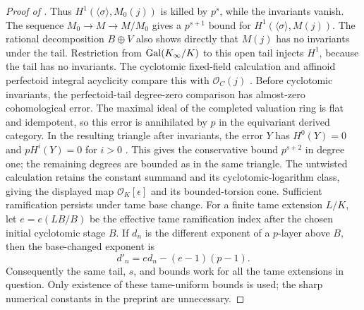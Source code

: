 \begin{proof}[Proof of ]
Thus $H^1(\langle\sigma\rangle,M_0(j))$ is killed by $p^s$,
while the invariants vanish.  The sequence $M_0\to M\to M/M_0$
gives a $p^{s+1}$ bound for $H^1(\langle\sigma\rangle,M(j))$.
The rational decomposition $B\oplus V$ also shows directly that
$M(j)$ has no invariants under the tail.
Restriction from $\operatorname{Gal}(K_\infty/K)$ to this open tail injects
$H^1$, because the tail has no invariants.  The cyclotomic fixed-field calculation and affinoid perfectoid
integral acyclicity compare this with $\mathcal O_C(j)$
\cite[Lemmas~4.3.2 and~4.3.5]{BSSW}.
Before cyclotomic invariants, the perfectoid-tail degree-zero
comparison has almost-zero cohomological error.  The maximal
ideal of the completed valuation ring is flat and idempotent,
so this error is annihilated by $p$ in the equivariant derived
category.  In the resulting triangle after invariants, the error
$Y$ has $H^0(Y)=0$ and $pH^i(Y)=0$ for $i>0$
\cite[Lemma~4.3.5 and Theorem~4.4.3]{BSSW}.
This gives the conservative bound $p^{s+2}$ in degree one;
the remaining degrees are bounded as in the same triangle.
The untwisted calculation retains the constant summand and its
cyclotomic-logarithm class, giving the displayed map
$\mathcal O_K[\epsilon]$ and its bounded-torsion cone.
Sufficient ramification persists under tame base change.  For a
finite tame extension $L/K$, let $e=e(LB/B)$ be the effective
tame ramification index after the chosen initial cyclotomic stage
$B$.  If $d_n$ is the different exponent of a $p$-layer above $B$,
then the base-changed exponent is
\[
 d'_n=e d_n-(e-1)(p-1).
\]
Consequently the same tail, $s$, and bounds work for all the
tame extensions in question.
Only existence of these tame-uniform bounds is used; the sharp
numerical constants in the preprint are unnecessary.


\end{proof}
